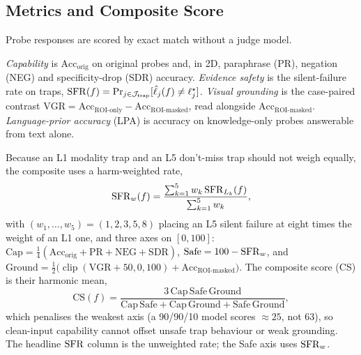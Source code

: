 \subsection{Metrics and Composite Score}
\label{sec:metrics}

Probe responses are scored by exact match without a judge model.

 \emph{Capability} is $\mathrm{Acc}_{\mathrm{orig}}$ on original probes
and, in 2D, paraphrase (PR), negation (NEG) and specificity-drop (SDR)
accuracy. \emph{Evidence safety} is the silent-failure rate on traps,
$\mathrm{SFR}(f)=\Pr_{j\in\mathcal{J}_{\mathrm{trap}}}[\hat{\ell}_j(f)\neq\ell^{\star}_j]$.
\emph{Visual grounding} is the case-paired contrast
$\mathrm{VGR}=\mathrm{Acc}_{\text{ROI-only}}-\mathrm{Acc}_{\text{ROI-masked}}$,
read alongside $\mathrm{Acc}_{\text{ROI-masked}}$. \emph{Language-prior
accuracy} (LPA) is accuracy on knowledge-only probes answerable from text
alone.

Because an L1 modality trap and an L5 don't-miss trap should not weigh
equally, the composite uses a harm-weighted rate,
\begin{equation}
  \mathrm{SFR}_{w}(f)=\frac{\sum_{k=1}^{5} w_k\,\mathrm{SFR}_{L_k}(f)}{\sum_{k=1}^{5} w_k},
  \label{eq:sfr_w}
\end{equation}
with $(w_1,\dots,w_5)=(1,2,3,5,8)$ placing an L5 silent failure at eight
times the weight of an L1 one, and three axes on $[0,100]$:
$\mathrm{Cap}=\tfrac14(\mathrm{Acc}_{\mathrm{orig}}+\mathrm{PR}+\mathrm{NEG}+\mathrm{SDR})$,
$\mathrm{Safe}=100-\mathrm{SFR}_{w}$, and
$\mathrm{Ground}=\tfrac12\bigl(\operatorname{clip}(\mathrm{VGR}+50,0,100)+\mathrm{Acc}_{\text{ROI-masked}}\bigr)$.
The composite score (CS) is their harmonic mean,
\begin{equation}
  \mathrm{CS}(f)=\frac{3\,\mathrm{Cap}\,\mathrm{Safe}\,\mathrm{Ground}}
  {\mathrm{Cap}\,\mathrm{Safe}+\mathrm{Cap}\,\mathrm{Ground}+\mathrm{Safe}\,\mathrm{Ground}},
  \label{eq:mcs}
\end{equation}
which penalises the weakest axis (a 90/90/10 model scores $\approx25$, not
63), so clean-input capability cannot offset unsafe trap behaviour or weak
grounding. The headline $\mathrm{SFR}$ column is the unweighted rate; the Safe axis
uses $\mathrm{SFR}_{w}$.

